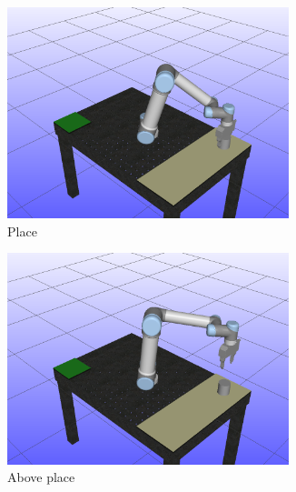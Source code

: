 \documentclass[../main.tex]{subfiles}
\begin{document}
\begin{figure}[H]
    \centering
    \begin{subfigure}[t]{0.3\textwidth}
        \centering
        \captionsetup{width=.9\textwidth}
        \includegraphics[width=0.9\textwidth]{figures/p2p_interpolation/on_pick.png}
        \caption{Place}
        \label{}
    \end{subfigure}
    \begin{subfigure}[t]{0.3\textwidth}
        \centering
        \captionsetup{width=.9\textwidth}
        \includegraphics[width=0.9\textwidth]{figures/p2p_interpolation/above_pick.png}
        \caption{Above place}
        \label{}
    \end{subfigure}
    \begin{subfigure}[t]{0.3\textwidth}
        \centering
        \captionsetup{width=.9\textwidth}

\end{subfigure}
\end{figure}
\end{document}
